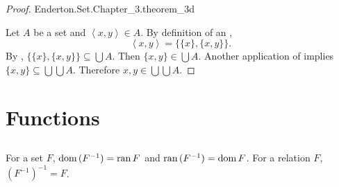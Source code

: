 \documentclass{report}
\newcommand{\pair}[1]{\left< #1 \right>}
\begin{document}
\begin{proof}

    {Enderton.Set.Chapter\_3.theorem\_3d}

  Let $A$ be a set and $\pair{x, y} \in A$.
  By definition of an ,
    $$\pair{x, y} = \{\{x\}, \{x, y\}\}.$$
  By , $\{\{x\}, \{x, y\}\} \subseteq \bigcup A$.
  Then $\{x, y\} \in \bigcup A$.
  Another application of  implies
    $\{x, y\} \subseteq \bigcup\bigcup A$.
  Therefore $x, y \in \bigcup\bigcup A$.

\end{proof}

\section{Functions}%

\subsection{}%

\begin{theorem}[3E]

  For a set $F$, $\mathop{\text{dom}}{(F^{-1})} = \mathop{\text{ran}}{F}$ and $\mathop{\text{ran}}{(F^{-1})} = \mathop{\text{dom}}{F}$.
  For a relation $F$, $(F^{-1})^{-1} = F$.

\end{theorem}
\end{document}
